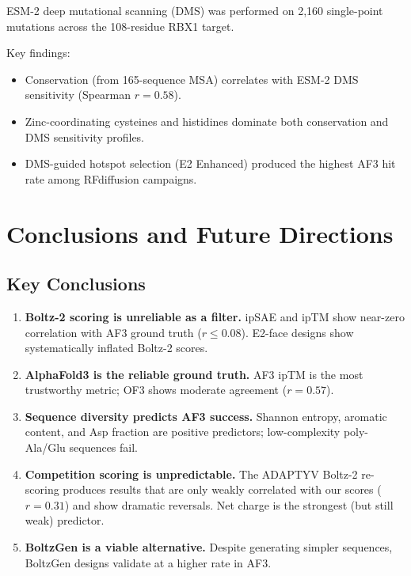 \documentclass[11pt,a4paper]{article}
\begin{document}
ESM-2 deep mutational scanning (DMS) was performed on 2,160 single-point mutations across the 108-residue RBX1 target.

Key findings:
\begin{itemize}
  \item Conservation (from 165-sequence MSA) correlates with ESM-2 DMS sensitivity (Spearman $r = 0.58$).
  \item Zinc-coordinating cysteines and histidines dominate both conservation and DMS sensitivity profiles.
  \item DMS-guided hotspot selection (E2 Enhanced) produced the highest AF3 hit rate among RFdiffusion campaigns.
\end{itemize}

\section{Conclusions and Future Directions}

\subsection{Key Conclusions}

\begin{enumerate}
  \item \textbf{Boltz-2 scoring is unreliable as a filter.} ipSAE and ipTM show near-zero correlation with AF3 ground truth ($r \leq 0.08$). E2-face designs show systematically inflated Boltz-2 scores.
  \item \textbf{AlphaFold3 is the reliable ground truth.} AF3 ipTM is the most trustworthy metric; OF3 shows moderate agreement ($r = 0.57$).
  \item \textbf{Sequence diversity predicts AF3 success.} Shannon entropy, aromatic content, and Asp fraction are positive predictors; low-complexity poly-Ala/Glu sequences fail.
  \item \textbf{Competition scoring is unpredictable.} The ADAPTYV Boltz-2 re-scoring produces results that are only weakly correlated with our scores ($r = 0.31$) and show dramatic reversals. Net charge is the strongest (but still weak) predictor.
  \item \textbf{BoltzGen is a viable alternative.} Despite generating simpler sequences, BoltzGen designs validate at a higher rate in AF3.
\end{enumerate}
\end{document}
